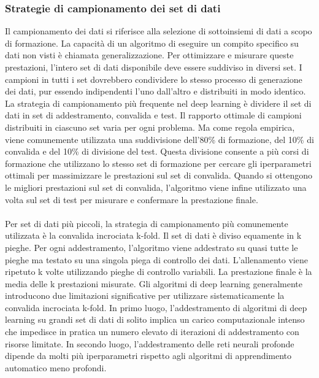 \documentclass[12pt,a4paper]{report}
\begin{document}
\subsubsection{Strategie di campionamento dei set di dati}
Il campionamento dei dati si riferisce alla selezione di sottoinsiemi di dati a scopo di formazione. La capacità di un algoritmo di eseguire un compito specifico su dati non visti è chiamata generalizzazione. Per ottimizzare e misurare queste prestazioni, l'intero set di dati disponibile deve essere suddiviso in diversi set. I campioni in tutti i set dovrebbero condividere lo stesso processo di generazione dei dati, pur essendo indipendenti l'uno dall'altro e distribuiti in modo identico.
La strategia di campionamento più frequente nel deep learning è dividere il set di dati in set di addestramento, convalida e test.
Il rapporto ottimale di campioni distribuiti in ciascuno set varia per ogni problema. Ma come regola empirica, viene comunemente utilizzata una suddivisione dell'80\% di formazione, del 10\% di convalida e del 10\% di divisione del test. Questa divisione consente a più corsi di formazione che utilizzano lo stesso set di formazione per cercare gli iperparametri ottimali per massimizzare le prestazioni sul set di convalida. Quando si ottengono le migliori prestazioni sul set di convalida, l'algoritmo viene infine utilizzato una volta sul set di test per misurare e confermare la prestazione finale.\\
\\
Per set di dati più piccoli, la strategia di campionamento più comunemente utilizzata è la convalida incrociata k-fold. Il set di dati è diviso equamente in k pieghe. Per ogni addestramento, l'algoritmo viene addestrato su quasi tutte le pieghe ma testato su una singola piega di controllo dei dati. L'allenamento viene ripetuto k volte utilizzando pieghe di controllo variabili. La prestazione finale è la media delle k prestazioni misurate.
Gli algoritmi di deep learning generalmente introducono due limitazioni significative per utilizzare sistematicamente la convalida incrociata k-fold. In primo luogo, l'addestramento di algoritmi di deep learning su grandi set di dati di solito implica un carico computazionale intenso che impedisce in pratica un numero elevato di iterazioni di addestramento con risorse limitate. In secondo luogo, l'addestramento delle reti neurali profonde dipende da molti più iperparametri rispetto agli algoritmi di apprendimento automatico meno profondi.\\
\end{document}
